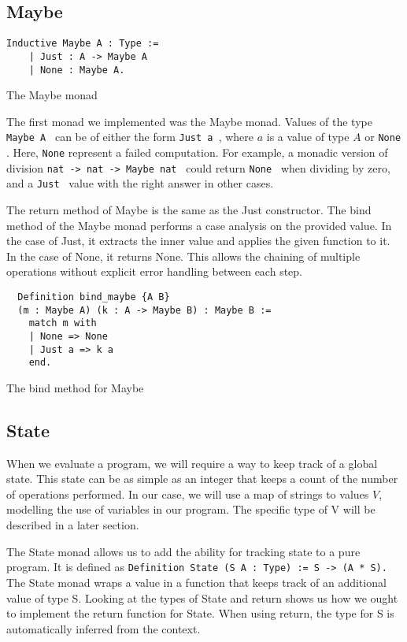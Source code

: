 \subsection{Maybe}
\begin{listing}[H]
\begin{verbatim}
Inductive Maybe A : Type :=
    | Just : A -> Maybe A
    | None : Maybe A.
\end{verbatim}
\caption{The Maybe monad}
\label{lst:maybe_monad}
\end{listing}

The first monad we implemented was the Maybe monad. Values of the type
\texttt{Maybe A } can be of either the form 
\texttt{Just a }, where $a$ is a value of type $A$ or 
\texttt{None }. Here, \texttt{None} represent a failed
computation. For example, a monadic version of division \texttt{nat ->
nat -> Maybe nat } could return \texttt{None } when dividing by zero,
and a \texttt{Just } value with the right answer in other cases.

The return method of Maybe is the same as the Just constructor. 
The bind method of the Maybe monad performs a case analysis on the provided
value. In the case of Just, it extracts the inner value and applies the given
function to it. In the case of None, it returns None. This allows the chaining
of multiple operations without explicit error handling between each step.

\begin{listing}[H]
\begin{verbatim}
  Definition bind_maybe {A B} 
  (m : Maybe A) (k : A -> Maybe B) : Maybe B :=
    match m with
    | None => None
    | Just a => k a
    end.
\end{verbatim}
\caption{The bind method for Maybe}
\label{lst:bind_maybe}
\end{listing}

\subsection{State}
When we evaluate a program, we will require a way to keep track of a global
state. This state can be as simple as an integer that keeps a count of the
number of operations performed. In our case, we will use a map of strings to
values $V$,  modelling the use of variables in our program. The specific type 
of V will be described in a later section.

The State monad allows us to add the ability for tracking state to a pure
program. It is defined as 
\texttt{Definition State (S A : Type) := S -> (A * S). } The State
monad wraps a value in a function that keeps track of an additional value of
type S. Looking at the types of State and return shows us how we ought to
implement the return function for State. When using return, the type for S 
is automatically inferred from the context.

